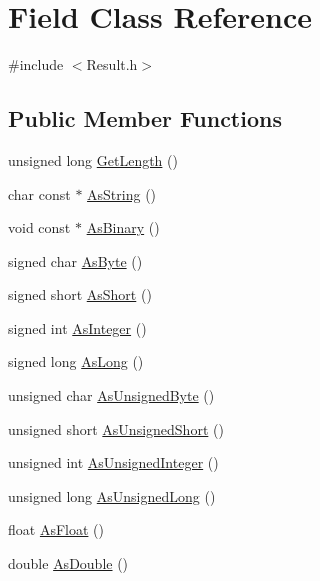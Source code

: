 \hypertarget{class_field}{}\section{Field Class Reference}
\label{class_field}


{\ttfamily \#include $<$Result.\+h$>$}

\subsection*{Public Member Functions}
\begin{DoxyCompactItemize}
\item 
unsigned long \hyperlink{class_field_ae48d2d566e71c7e10387239088f3bfc1}{Get\+Length} ()
\item 
char const $\ast$ \hyperlink{class_field_a50c5aab1ef8ad1ba606a2c0f3d1beab4}{As\+String} ()
\item 
void const $\ast$ \hyperlink{class_field_a492e8bf02e600bacb2b28c8908602964}{As\+Binary} ()
\item 
signed char \hyperlink{class_field_a1f47fef90e4a81ece884eb6f0723d586}{As\+Byte} ()
\item 
signed short \hyperlink{class_field_a4b6e6d21cdc8db6fe27adbd6f562f62b}{As\+Short} ()
\item 
signed int \hyperlink{class_field_a3d668e29ea638fb7069fb2e114cbc8fd}{As\+Integer} ()
\item 
signed long \hyperlink{class_field_a7c1046b192677e82c83afaf0875c2aff}{As\+Long} ()
\item 
unsigned char \hyperlink{class_field_a846b2a4c9e9314ecf6e53aab1573aaaf}{As\+Unsigned\+Byte} ()
\item 
unsigned short \hyperlink{class_field_a7051f8380ed553eb98cd8767e09e92b4}{As\+Unsigned\+Short} ()
\item 
unsigned int \hyperlink{class_field_a9ddf8f87233d80ab04ab38bbed6ff323}{As\+Unsigned\+Integer} ()
\item 
unsigned long \hyperlink{class_field_a572a6f772eedfc783182bba7cee7c493}{As\+Unsigned\+Long} ()
\item 
float \hyperlink{class_field_ae087237268ae757b658176288dd45650}{As\+Float} ()
\item 
double \hyperlink{class_field_a0fa30ad3c43f514a0cee6052c0b43fab}{As\+Double} ()
\end{DoxyCompactItemize}

